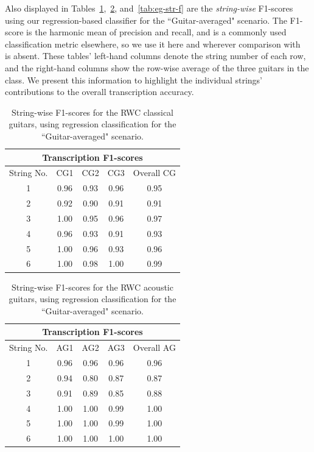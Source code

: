 \documentclass[12pt]{cmuthesis}
\begin{document}
Also displayed in Tables~\ref{tab:cg-str-f},~\ref{tab:ag-str-f}, and~\ref{tab:eg-str-f} are the \textit{string-wise} F1-scores using our regression-based classifier for the ``Guitar-averaged" scenario. The F1-score is the harmonic mean of precision and recall, and is a commonly used classification metric elsewhere, so we use it here and wherever comparison with~\cite{barbanchoi2012} is absent. These tables' left-hand columns denote the string number of each row, and the right-hand columns show the row-wise average of the three guitars in the class. We present this information to highlight the individual strings' contributions to the overall transcription accuracy.

\begin{table}[!htbp]
\begin{center}
\begin{tabular}{||c|c|c|c|c||}
\hline
\multicolumn{5}{||c||}{\bf{Transcription F1-scores}} \\
\hline
String No. & CG1 & CG2 & CG3 & Overall CG \\
\hline
1 & 0.96 & 0.93 & 0.96 & 0.95\\
\hline
2 & 0.92 & 0.90 & 0.91 & 0.91\\
\hline
3 & 1.00 & 0.95 & 0.96 & 0.97\\
\hline
4 & 0.96 & 0.93 & 0.91 & 0.93\\
\hline
5 & 1.00 & 0.96 & 0.93 & 0.96 \\
\hline
6 & 1.00 & 0.98 & 1.00 & 0.99\\ 
\hline
\hline
\end{tabular}
\caption{String-wise F1-scores for the RWC classical guitars, using regression classification for the ``Guitar-averaged" scenario.} 
\label{tab:cg-str-f}
\end{center}
\end{table}

\begin{table}[!htbp]
\begin{center}
\begin{tabular}{||c||c|c|c|c||}
\hline
\multicolumn{5}{||c||}{\bf{Transcription F1-scores}} \\
\hline
String No. & AG1 & AG2 & AG3 & Overall AG \\
\hline
1 &  0.96 & 0.96 & 0.96 & 0.96 \\
\hline
2 & 0.94 & 0.80 & 0.87 &  0.87\\
\hline
3 & 0.91 & 0.89 & 0.85 & 0.88\\
\hline
4 & 1.00 & 1.00 & 0.99 &  1.00 \\
\hline
5 & 1.00 & 1.00 & 0.99 &  1.00 \\
\hline
6 & 1.00 & 1.00 & 1.00 & 1.00 \\ 
\hline
\hline
\end{tabular}
\caption{String-wise F1-scores for the RWC acoustic guitars, using regression classification for the ``Guitar-averaged" scenario.} 
\label{tab:ag-str-f}
\end{center}
\end{table}
\end{document}
